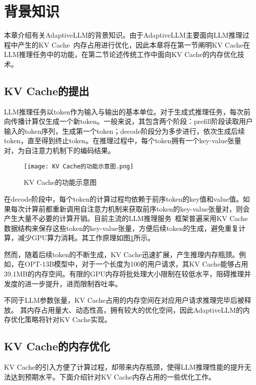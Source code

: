 \section{背景知识}

本章介绍有关AdaptiveLLM的背景知识。由于AdaptiveLLM主要面向LLM推理过程中产生的KV Cache~\cite{KV-Cache}内存占用进行优化，因此本章将在第一节阐明KV Cache在LLM推理任务中的功能，在第二节论述传统工作中面向KV Cache的内存优化技术。

\subsection{KV Cache的提出}

LLM推理任务以token作为输入与输出的基本单位。对于生成式推理任务，每次前向传播计算仅生成一个新token。一般来说，其包含两个阶段：prefill阶段读取用户输入的token序列，生成第一个token；decode阶段分为多步进行，依次生成后续token，直至得到终止token。在推理过程中，每个token拥有一个key-value张量对，为自注意力机制下的编码结果。

\begin{figure}[!htbp]
  \centering
  \texttt{[image: KV Cache的功能示意图.png]}
  \caption{KV Cache的功能示意图}
  \label{Fig:KV Cache的功能示意图}
\end{figure}

在decode阶段中，每个token的计算过程均依赖于前序token的key值和value值。如果每次计算前都重新调用自注意力机制来获取前序token的key-value张量对，则会产生大量不必要的计算开销。目前主流的LLM推理服务~\cite{Swapping, vLLM, ORCA, SpecInfer,SARATHI}框架普遍采用KV Cache数据结构来保存这些token的key-value张量，方便后续token的生成，避免重复计算，减少GPU算力消耗。其工作原理如图\ref{Fig:KV Cache的功能示意图}所示。

然而，随着后续token的不断生成，KV Cache迅速扩展，产生推理内存瓶颈。例如，在OPT-13B模型中，对于一个长度为100的用户请求，其KV Cache能够占用39.1MB的内存空间。有限的GPU内存将批处理大小限制在较低水平，阻碍推理并发度的进一步提升，进而限制吞吐率。

不同于LLM参数张量，KV Cache占用的内存空间在对应用户请求推理完毕后被释放。 其内存占用量大、动态性高，拥有较大的优化空间，因此AdaptiveLLM的内存优化策略将针对KV Cache实现。

\subsection{KV Cache的内存优化}

KV Cache的引入方便了计算过程，却带来内存瓶颈，使得LLM推理性能的提升无法达到预期水平。下面介绍针对KV Cache内存占用的一些优化工作。

